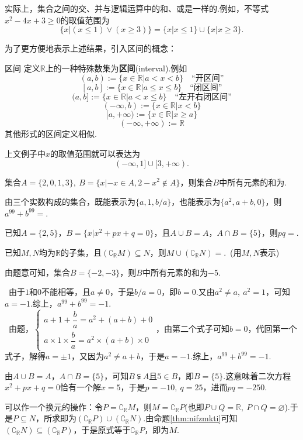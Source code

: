 \documentclass[lang=cn, zihao=5]{elegantbook}
\newcommand{\R}{\mathbb{R}}
\newcommand{\sw}[1]{\boxed{\text{解法 #1}} \ }
\newcommand{\tk}{\uline{\hspace{4em}}}
\begin{document}
实际上，集合之间的交、并与逻辑运算中的和、或是一样的.例如，不等式$x^2-4x+3 \geq 0$的取值范围为$$\{ x|(x \leq 1) \vee (x \geq 3) \} = \{ x|x \leq 1 \} \cup \{ x|x \geq 3 \}.$$

为了更方便地表示上述结果，引入区间的概念：

\begin{definition}{区间}
	定义$\R$上的一种特殊数集为\textbf{区间}(interval).例如 \\
	$$(a,b):=\{ x \in \R | a<x<b \} \quad \textit{“开区间”}$$
	$$[a,b]:=\{ x \in \R | a \leq x \leq b \} \quad \textit{“闭区间”}$$
	$$(a,b]:=\{ x \in \R | a<x \leq b \} \quad \textit{“左开右闭区间”}$$
	$$(-\infty,b):=\{ x \in \R | x<b \}$$
	$$[a,+\infty):=\{ x \in \R | x \geq a \}$$
	$$(-\infty ,+\infty):= \R $$
	其他形式的区间定义相似.
\end{definition}

上文例子中$x$的取值范围就可以表达为$$(-\infty ,1] \cup [3,+\infty ).$$

\begin{problemset}
	\item 集合$A=\{ 2,0,1,3 \},~B = \{ x|-x \in A,2-x^2 \notin A \}$，则集合$B$中所有元素的和为\tk .
	\item 由三个实数构成的集合，既能表示为$\{ a,1,b/a \}$，也能表示为$\{ a^2,a+b,0 \}$，则$a^{99}+b^{99}=$\tk .
	\item 已知$A=\{ 2,5 \}$，$B = \{ x|x^2+px+q=0 \}$，且$A \cup B = A$，$A \cap B = \{ 5 \}$，则$pq=$\tk .
	\item 已知$M,N$均为$\mathbb{R}$的子集，且$(\complement _{\mathbb{R}} M) \subseteq N$，则$M \cup (\complement _{\mathbb{R}} N)=$\tk .~(用$M,N$表示)
\end{problemset}
\begin{psolution}
	\item 由题意可知，集合$B=\{ -2,-3 \}$，则$B$中所有元素的和为$-5$.
	\item \sw{一}由于$1$和$0$不能相等，且$a \neq 0$，于是$b/a=0$，即$b=0$.又由$a^2 \neq a,~a^2=1$，可知$a=-1$.综上，$a^{99}+b^{99}=-1$. \\
	\sw{二}由题，$\begin{cases}
		a+1+\dfrac{b}{a} = a^2+(a+b) + 0 \\ a \times 1 \times \dfrac{b}{a} = a^2 \times (a+b) \times 0
	\end{cases}$，由第二个式子可知$b=0$，代回第一个式子，解得$a= \pm 1$，又因为$a^2 \neq a+b$，于是$a=-1$.综上，$a^{99}+b^{99}=-1$.
	\item 由$A \cup B = A$，$A \cap B = \{ 5 \}$，可知$B \subsetneqq A$且$5 \in B$，即$B=\{ 5 \}$.这意味着二次方程$x^2+px+q=0$恰有一个解$x=5$，于是$p=-10,~q=25$，进而$pq=-250$.
	\item 可以作一个换元的操作：令$P=\complement _{\mathbb{R}} M$，则$M=\complement _{\mathbb{R}} P$(也即$P \cup Q=\R ,~P \cap Q = \varnothing$).于是$P \subseteq N$，所求即为$(\complement _{\mathbb{R}} P) \cup (\complement _{\mathbb{R}} N)$.由命题\ref{thm:nifzmkti}可知$(\complement _{\mathbb{R}} N) \subseteq (\complement _{\mathbb{R}} P)$，于是原式等于$\complement _{\mathbb{R}} P$，即为$M$.
\end{psolution}
\end{document}
